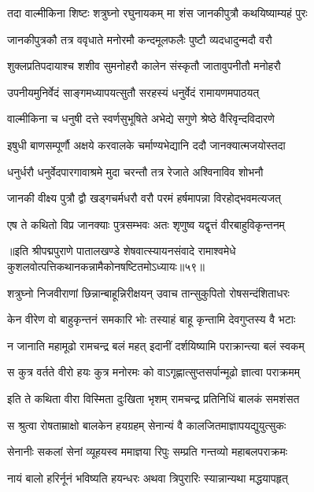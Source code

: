 \twolineshloka
{तदा वाल्मीकिना शिष्टः शत्रुघ्नो रघुनायकम्}
{मा शंस जानकीपुत्रौ कथयिष्याम्यहं पुरः}%

\twolineshloka
{जानकीपुत्रकौ तत्र ववृधाते मनोरमौ}
{कन्दमूलफलैः पुष्टौ व्यदधादुन्मदौ वरौ}%

\twolineshloka
{शुक्लप्रतिपदायाश्च शशीव सुमनोहरौ}
{कालेन संस्कृतौ जातावुपनीतौ मनोहरौ}%

\twolineshloka
{उपनीयमुनिर्वेदं साङ्गमध्यापयत्सुतौ}
{सरहस्यं धनुर्वेदं रामायणमपाठयत्}%

\twolineshloka
{वाल्मीकिना च धनुषी दत्ते स्वर्णसुभूषिते}
{अभेद्ये सगुणे श्रेष्ठे वैरिवृन्दविदारणे}%

\twolineshloka
{इषुधी बाणसम्पूर्णौ अक्षये करवालके}
{चर्माण्यभेद्यानि ददौ जानक्यात्मजयोस्तदा}%

\twolineshloka
{धनुर्धरौ धनुर्वेदपारगावाश्रमे मुदा}
{चरन्तौ तत्र रेजाते अश्विनाविव शोभनौ}%

\twolineshloka
{जानकी वीक्ष्य पुत्रौ द्वौ खड्गचर्मधरौ वरौ}
{परमं हर्षमापन्ना विरहोद्भवमत्यजत्}%

\twolineshloka
{एष ते कथितो विप्र जानक्याः पुत्रसम्भवः}
{अतः शृणुष्व यद्वृत्तं वीरबाहुविकृन्तनम्}%

{॥इति श्रीपद्मपुराणे पातालखण्डे शेषवात्स्यायनसंवादे रामाश्वमेधे कुशलवोत्पत्तिकथानकन्नामैकोनषष्टितमोऽध्यायः॥५९॥}



\twolineshloka
{शत्रुघ्नो निजवीराणां छिन्नान्बाहून्निरीक्षयन्}
{उवाच तान्सुकुपितो रोषसन्दंशिताधरः}%

\twolineshloka
{केन वीरेण वो बाहुकृन्तनं समकारि भोः}
{तस्याहं बाहू कृन्तामि देवगुप्तस्य वै भटाः}%

\twolineshloka
{न जानाति महामूढो रामचन्द्र बलं महत्}
{इदानीं दर्शयिष्यामि पराक्रान्त्या बलं स्वकम्}%

\twolineshloka
{स कुत्र वर्तते वीरो हयः कुत्र मनोरमः}
{को वाऽगृह्णात्सुप्तसर्पान्मूढो ज्ञात्वा पराक्रमम्}%

\twolineshloka
{इति ते कथिता वीरा विस्मिता दुःखिता भृशम्}
{रामचन्द्र प्रतिनिधिं बालकं समशंसत}%

\twolineshloka
{स श्रुत्वा रोषताम्राक्षो बालकेन हयग्रहम्}
{सेनान्यं वै कालजितमाज्ञापयद्युयुत्सुकः}%

\twolineshloka
{सेनानीः सकलां सेनां व्यूहयस्व ममाज्ञया}
{रिपुः सम्प्रति गन्तव्यो महाबलपराक्रमः}%

\twolineshloka
{नायं बालो हरिर्नूनं भविष्यति हयन्धरः}
{अथवा त्रिपुरारिः स्यान्नान्यथा मद्धयापहृत्}%

